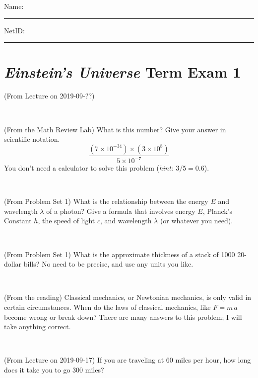 \documentclass[12pt, letterpaper]{article}
\begin{document}
\noindent
Name: \rule[-1ex]{0.60\textwidth}{0.1pt}
NetID: \rule[-1ex]{0.20\textwidth}{0.1pt}

\section*{\textsl{Einstein's Universe} Term Exam 1}
\setcounter{problem}{1}


\begin{problem} (From Lecture on 2019-09-??)
\end{problem}


\vfill ~

\begin{problem} (From the Math Review Lab)
What is this number? Give your answer in scientific notation.
$$
\frac{(7\times10^{-34})\times(3\times10^8)}{5\times10^{-7}}
$$
You don't need a calculator to solve this problem (\textit{hint: $3/5=0.6$}).
\end{problem}


\vfill ~

\begin{problem} (From Problem Set 1)
What is the relationship between the energy $E$ and wavelength
$\lambda$ of a photon? Give a formula that involves energy $E$,
Planck's Constant $h$, the speed of light $c$, and wavelength
$\lambda$ (or whatever you need).
\end{problem}

\vfill ~

\begin{problem} (From Problem Set 1)
What is the approximate thickness of a stack of 1000 20-dollar bills?
No need to be precise, and use any units you like.
\end{problem}


\vfill ~


\clearpage


\begin{problem} (From the reading)
Classical mechanics, or Newtonian mechanics, is only valid in certain
circumstances. When do the laws of classical mechanics, like $F =
m\,a$ become wrong or break down? There are many answers to this
problem; I will take anything correct.
\end{problem}


\vfill ~

\begin{problem} (From Lecture on 2019-09-17)
If you are traveling at 60 miles per hour, how long does
it take you to go 300 miles?
\end{problem}
\end{document}
